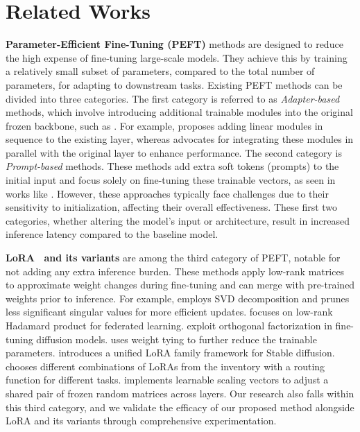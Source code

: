 \documentclass{article}
\theoremstyle{plain}
\theoremstyle{definition}
\theoremstyle{remark}
\begin{document}
\section{Related Works}
\textbf{Parameter-Efficient Fine-Tuning (PEFT)} methods are designed to reduce the high expense of fine-tuning large-scale models. They achieve this by training a relatively small subset of parameters, compared to the total number of parameters, for adapting to downstream tasks. Existing PEFT methods can be divided into three categories. The first category is referred to as \textit{Adapter-based} methods, which involve introducing additional trainable modules into the original frozen backbone, such as \cite{houlsby2019series, he2022parallel, mahabadi2021parameterefficient, mahabadi2021compacter}. For example, \cite{houlsby2019series} proposes adding linear modules in sequence to the existing layer, whereas \cite{he2022parallel} advocates for integrating these modules in parallel with the original layer to enhance performance. The second category is \textit{Prompt-based} methods. These methods add extra soft tokens (prompts) to the initial input and focus solely on fine-tuning these trainable vectors, as seen in works like \cite{lester2021power, razdaibiedina2023residual, wang2023nonintrusive}. However, these approaches typically face challenges due to their sensitivity to initialization, affecting their overall effectiveness. These first two categories, whether altering the model's input or architecture, result in increased inference latency compared to the baseline model.

\textbf{LoRA~\cite{hu2022lora} and its variants} are among the third category of PEFT, notable for not adding any extra inference burden. These methods apply low-rank matrices to approximate weight changes during fine-tuning and can merge with pre-trained weights prior to inference. For example, \cite{zhang2023adalora} employs SVD decomposition and prunes less significant singular values for more efficient updates. \cite{hyeonwoo2023fedpara} focuses on low-rank Hadamard product for federated learning. \cite{qiu2023controlling, liu2023butterfly} exploit orthogonal factorization in fine-tuning diffusion models. \cite{renduchintala2023tied} uses weight tying to further reduce the trainable parameters. \cite{yeh2023navigating} introduces a unified LoRA family framework for Stable diffusion. \cite{ponti2022combining} chooses different combinations of LoRAs from the inventory with a routing function for different tasks. \cite{kopiczko2023vera} implements learnable scaling vectors to adjust a shared pair of frozen random matrices across layers. Our research also falls within this third category, and we validate the efficacy of our proposed method alongside LoRA and its variants through comprehensive experimentation.
\end{document}

